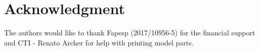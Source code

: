 \documentclass[journal]{IEEEtran}
\begin{document}



\section*{Acknowledgment}


The authors would like to thank Fapesp (2017/10956-5) for the financial support and CTI - Renato Archer for help with printing model parts.

\ifCLASSOPTIONcaptionsoff
  \newpage
\fi






%

%

\end{document}
